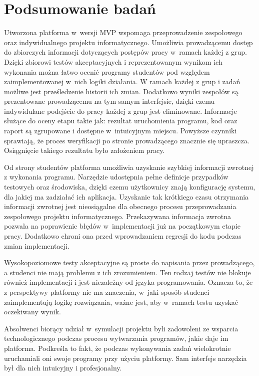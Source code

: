 \section{Podsumowanie badań}
\label{research_summary}

Utworzona platforma w~wersji MVP wspomaga przeprowadzenie zespołowego oraz indywidualnego projektu informatycznego.
Umożliwia prowadzącemu dostęp do zbiorczych informacji dotyczących postępów pracy w~ramach każdej z grup.
Dzięki zbiorowi testów akceptacyjnych i reprezentowanym wynikom ich wykonania można łatwo ocenić programy studentów pod względem zaimplementowanej w~nich logiki działania.
W ramach każdej z grup i zadań możliwe jest prześledzenie historii ich zmian.
Dodatkowo wyniki zespołów są prezentowane prowadzącemu na tym samym interfejsie, dzięki czemu indywidulane podejście do pracy każdej z grup jest eliminowane.
Informacje służące do oceny etapu takie jak: rezultat uruchomienia programu, kod oraz raport są zgrupowane i dostępne w~intuicyjnym miejscu.
Powyższe czynniki sprawiają, że proces weryfikacji po stronie prowadzącego znacznie się upraszcza.
Osiągnięcie takiego rezultatu było założeniem pracy.

Od strony studentów platforma umożliwia uzyskanie szybkiej informacji zwrotnej z wykonania programu.
Narzędzie udostępnia pełne definicje przypadków testowych oraz środowiska, dzięki czemu użytkownicy znają konfigurację systemu, dla jakiej ma zadziałać ich aplikacja.
Uzyskanie tak krótkiego czasu otrzymania informacji zwrotnej jest nieosiągalne dla obecnego procesu przeprowadzania zespołowego projektu informatycznego.
Przekazywana informacja zwrotna pozwala na poprawienie błędów w~implementacji już na początkowym etapie pracy.
Dodatkowo chroni ona przed wprowadzaniem regresji do kodu podczas zmian implementacji.

Wysokopoziomowe testy akceptacyjne są proste do napisania przez prowadzącego, a studenci nie mają problemu z ich zrozumieniem.
Ten rodzaj testów nie blokuje również implementacji i jest niezależny od języka programowania.
Oznacza to, że z perspektywy platformy nie ma znaczenia, w~jaki sposób studenci zaimplementują logikę rozwiązania, ważne jest, aby w~ramach testu uzyskać oczekiwany wynik.

Absolwenci biorący udział w~symulacji projektu byli zadowoleni ze wsparcia technologicznego podczas procesu wytwarzania programów, jakie daje im platforma.
Podkreśla to fakt, że podczas wykonywania zadań wielokrotnie uruchamiali oni swoje programy przy użyciu platformy.
Sam interfejs narzędzia był dla nich intuicyjny i profesjonalny.

